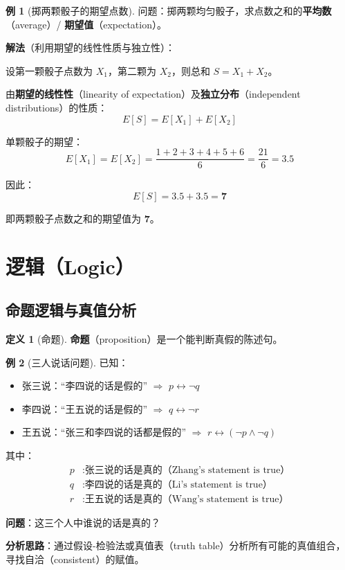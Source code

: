 \documentclass[UTF8,11pt,a4paper]{ctexbook}   %
\theoremstyle{definition}
\newtheorem{definition}{定义}[section]
\newtheorem{example}{例}[section]
\begin{document}
\begin{example}[掷两颗骰子的期望点数]
问题：掷两颗均匀骰子，求点数之和的\textbf{平均数}（average）/ \textbf{期望值}（expectation）。

\textbf{解法}（利用期望的线性性质与独立性）：

设第一颗骰子点数为 $X_1$，第二颗为 $X_2$，则总和 $S = X_1 + X_2$。

由\textbf{期望的线性性}（linearity of expectation）及\textbf{独立分布}（independent distributions）的性质：
\[
E[S] = E[X_1] + E[X_2]
\]

单颗骰子的期望：
\[
E[X_1] = E[X_2] = \frac{1+2+3+4+5+6}{6} = \frac{21}{6} = 3.5
\]

因此：
\[
E[S] = 3.5 + 3.5 = \mathbf{7}
\]

即两颗骰子点数之和的期望值为 \textbf{7}。
\end{example}

\section{逻辑（Logic）}

\subsection{命题逻辑与真值分析}

\begin{definition}[命题]
\textbf{命题}（proposition）是一个能判断真假的陈述句。
\end{definition}

\begin{example}[三人说话问题]
已知：
\begin{itemize}
    \item 张三说：``李四说的话是假的'' \quad $\Rightarrow$ \quad $p \leftrightarrow \neg q$
    \item 李四说：``王五说的话是假的'' \quad $\Rightarrow$ \quad $q \leftrightarrow \neg r$
    \item 王五说：``张三和李四说的话都是假的'' \quad $\Rightarrow$ \quad $r \leftrightarrow (\neg p \land \neg q)$
\end{itemize}

其中：
\begin{align*}
p &: \text{张三说的话是真的（Zhang's statement is true）} \\
q &: \text{李四说的话是真的（Li's statement is true）} \\
r &: \text{王五说的话是真的（Wang's statement is true）}
\end{align*}

\textbf{问题}：这三个人中谁说的话是真的？

\vspace{0.5em}
\textbf{分析思路}：通过假设-检验法或真值表（truth table）分析所有可能的真值组合，寻找自洽（consistent）的赋值。
\end{example}
\end{document}
